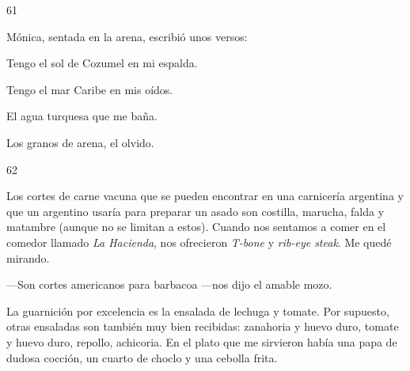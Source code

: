 \documentclass[12pt,twoside,openright,a5paper]{book}
\begin{document}
\vspace{0.5cm}

\hrulefill \hspace{0.1cm}\decofourleft\hspace{0.2cm} 61 \hspace{0.2cm}\decofourright \hspace{0.1cm}\hrulefill

\nopagebreak

\vspace{0.5cm}

\nopagebreak

Mónica, sentada en la arena, escribió unos versos: 

\vspace{0.5cm}

Tengo el sol de Cozumel en mi espalda.

Tengo el mar Caribe en mis oídos.

El agua turquesa que me baña.

Los granos de arena, el olvido.

\vspace{0.5cm}

\hrulefill \hspace{0.1cm}\decofourleft\hspace{0.2cm} 62 \hspace{0.2cm}\decofourright \hspace{0.1cm}\hrulefill

\nopagebreak

\vspace{0.5cm}

\nopagebreak

Los cortes de carne vacuna que se pueden encontrar en una carnicería
argentina y que un argentino usaría para preparar un asado son costilla, marucha, falda y matambre (aunque no se limitan a estos). Cuando nos sentamos
a comer en el comedor llamado \emph{La Hacienda}, nos ofrecieron \emph{T-bone} y \emph{rib-eye
steak}. Me quedé mirando.

---Son cortes americanos para barbacoa ---nos dijo el amable mozo.

La guarnición por excelencia es la ensalada de lechuga y tomate. Por
supuesto, otras ensaladas son también muy bien recibidas: zanahoria y huevo
duro, tomate y huevo duro, repollo, achicoria. En el plato que me sirvieron
había una papa de dudosa cocción, un cuarto de choclo y una cebolla frita.
\end{document}
